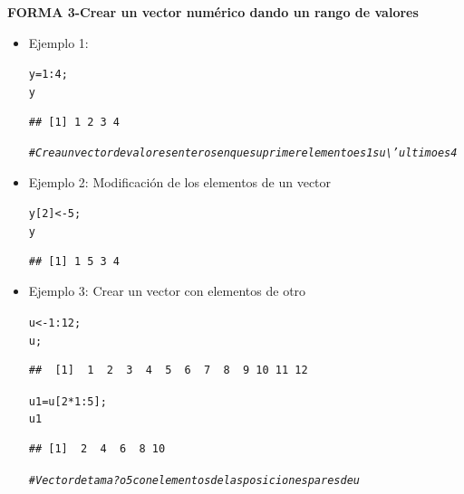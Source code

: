 \documentclass[12pt,letterpaper]{article}\usepackage[]{graphicx}\usepackage[]{color}
\makeatletter
\newcommand{\hlnum}[1]{\textcolor[rgb]{0.686,0.059,0.569}{#1}}%
\newcommand{\hlcom}[1]{\textcolor[rgb]{0.678,0.584,0.686}{\textit{#1}}}%
\newcommand{\hlopt}[1]{\textcolor[rgb]{0,0,0}{#1}}%
\newcommand{\hlstd}[1]{\textcolor[rgb]{0.345,0.345,0.345}{#1}}%
\newcommand{\hlkwb}[1]{\textcolor[rgb]{0.69,0.353,0.396}{#1}}%
\newenvironment{kframe}{%
 \def\at@end@of@kframe{}%
 \ifinner\ifhmode%
  \def\at@end@of@kframe{\end{minipage}}%
  \begin{minipage}{\columnwidth}%
 \fi\fi%
 \def\FrameCommand##1{\hskip\@totalleftmargin \hskip-\fboxsep
 \colorbox{shadecolor}{##1}\hskip-\fboxsep
     \hskip-\linewidth \hskip-\@totalleftmargin \hskip\columnwidth}%
 \MakeFramed {\advance\hsize-\width
   \@totalleftmargin\z@ \linewidth\hsize
   \@setminipage}}%
 {\par\unskip\endMakeFramed%
 \at@end@of@kframe}
\newenvironment{knitrout}{}{} %
\makeatother
\begin{document}
\textbf{FORMA 3-Crear un vector num\'erico dando un rango de valores}
\begin{itemize}
\item Ejemplo 1: 
\begin{knitrout}
\color{fgcolor}\begin{kframe}
\begin{alltt}
\hlstd{y} \hlkwb{=} \hlnum{1}\hlopt{:}\hlnum{4}\hlstd{;}
\hlstd{y}
\end{alltt}
\begin{verbatim}
## [1] 1 2 3 4
\end{verbatim}
\begin{alltt}
\hlcom{# Crea un vector de valores enteros en que su primer elemento es 1 su \textbackslash{}'ultimo es 4}
\end{alltt}
\end{kframe}
\end{knitrout}
\item Ejemplo 2: Modificaci\'on de los elementos de un vector
\begin{knitrout}
\color{fgcolor}\begin{kframe}
\begin{alltt}
\hlstd{y[}\hlnum{2}\hlstd{]} \hlkwb{<-} \hlnum{5}\hlstd{;}
\hlstd{y}
\end{alltt}
\begin{verbatim}
## [1] 1 5 3 4
\end{verbatim}
\end{kframe}
\end{knitrout}
\item Ejemplo 3: Crear un vector con elementos de otro
\begin{knitrout}
\color{fgcolor}\begin{kframe}
\begin{alltt}
\hlstd{u} \hlkwb{<-} \hlnum{1}\hlopt{:}\hlnum{12}\hlstd{;}
\hlstd{u;}
\end{alltt}
\begin{verbatim}
##  [1]  1  2  3  4  5  6  7  8  9 10 11 12
\end{verbatim}
\begin{alltt}
\hlstd{u1}\hlkwb{=}\hlstd{u[}\hlnum{2} \hlopt{*} \hlnum{1}\hlopt{:}\hlnum{5}\hlstd{];}
\hlstd{u1}
\end{alltt}
\begin{verbatim}
## [1]  2  4  6  8 10
\end{verbatim}
\begin{alltt}
\hlcom{# Vector de tama?o 5 con elementos de las posiciones pares de u}
\end{alltt}
\end{kframe}
\end{knitrout}
\end{itemize}
\end{document}
